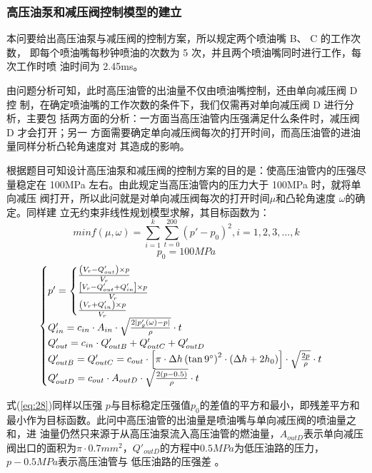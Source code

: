 \documentclass{cumcmthesis}
\begin{document}
\subsubsection{高压油泵和减压阀控制模型的建立}
本问要给出高压油泵与减压阀的控制方案，所以规定两个喷油嘴 B、 C 的工作次数， 即每个喷油嘴每秒钟喷油的次数为 5 次，并且两个喷油嘴同时进行工作，每次工作时喷 油时间为 2.45ms。

由问题分析可知，此时高压油管的出油量不仅由喷油嘴控制，还由单向减压阀 D 控 制，在确定喷油嘴的工作次数的条件下，我们仅需再对单向减压阀 D 进行分析，主要包 括两方面的分析：一方面当高压油管内压强满足什么条件时，减压阀 D 才会打开；另一 方面需要确定单向减压阀每次的打开时间，而高压油管的进油量同样分析凸轮角速度对 其造成的影响。 

根据题目可知设计高压油泵和减压阀的控制方案的目的是：使高压油管内的压强尽 量稳定在 100MPa 左右。由此规定当高压油管内的压力大于 100MPa 时，就将单向减压 阀打开，所以此问就是对单向减压阀每次的打开时间$\mu$和凸轮角速度 $\omega$的确定。同样建 立无约束非线性规划模型求解，其目标函数为： 
\begin{equation}
minf\left(\mu,\omega\right)=\sum_{i=1}^{k}\sum_{t=0}^{200}\left(p'-p_{0}\right)^{2},i=1,2,3,...,k
\label{eq:28}
\end{equation}
\begin{equation*}
p_{0}=100MPa
\end{equation*}
\begin{equation*}
\begin{cases}
p'=\begin{cases}
\frac{\left(V_{r}-Q'_{out}\right)\times p}{V_{r}}\\
\frac{\left[V_{r}-Q'_{out}+Q'_{in}\right]\times p}{V_{r}}\\
\frac{\left(V_{r}+Q'_{in}\right)\times p}{V_{r}}
\end{cases}\\
Q'_{in}=c_{in}\cdot A_{in} \cdot \sqrt{\frac{2\lvert p'_{g}\left(\omega\right)-p\rvert}{\rho}}\cdot t\\
Q'_{out}=c_{in}\cdot Q'_{outB}+Q'_{outC}+Q'_{outD}\\
Q'_{outB}=Q'_{outC}=c_{out}\cdot\left[\pi\cdot\Delta h\left(\tan 9\degree\right)^{2}\cdot\left(\Delta h+2h_{0}\right)\right]\cdot\sqrt{\frac{2p}{\rho}}\cdot t\\
Q'_{outD}=c_{out}\cdot A_{outD}\cdot \sqrt{\frac {2\left(p-0.5\right)}{\rho}}\cdot t
\end{cases}
\end{equation*}

式(\ref{eq:28})同样以压强 $p$与目标稳定压强值$p_{0}$的差值的平方和最小，即残差平方和 最小作为目标函数。此问中高压油管的出油量是喷油嘴与单向减压阀的喷油量之和，进 油量仍然只来源于从高压油泵流入高压油管的燃油量，$A_{outD}$表示单向减压阀出口的面积为$\pi\cdot0.7mm^{2}$，$Q'_{outD}$的方程中$0.5MPa$为低压油路的压力，$p-0.5MPa$表示高压油管与 低压油路的压强差 。
\end{document}
